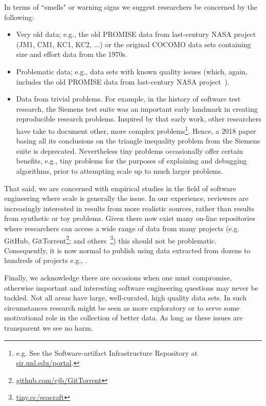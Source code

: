 \documentclass[preprint,10pt]{elsarticle}
\begin{document}
In terms of ``smells" or warning signs we suggest researchers be concerned by the following:
\begin{itemize}
\item Very old data; e.g., the old PROMISE data from last-century NASA project (JM1, CM1, KC1, KC2, ...) or the original COCOMO data sets containing size and effort data from the 1970s.
\item Problematic data; e.g., data sets with known quality issues (which, again, includes the old PROMISE data from last-century NASA project~\cite{shepperd13}).
\item Data from trivial problems.
For example, in the history of
software test research, the Siemens test suite
was an important early landmark in creating reproducible research problems. Inspired by that early work, other researchers have take to document other, more complex problems\footnote{e.g. See the Software-artifact Infrastructure Repository at
\href{http://sir.unl.edu/portal}{sir.unl.edu/portal}.}. Hence, a 2018 paper basing all its conclusions on the   triangle inequality problem
from the Siemens suite is deprecated.   Nevertheless tiny problems occasionally offer certain benefits, e.g., tiny problems for the purposes of explaining and debugging algorithms, prior to attempting scale up to much larger problems. 
\end{itemize}

That said, we are concerned with empirical studies in the field of software engineering where scale is generally the issue. In our experience, reviewers are increasingly interested in results from more realistic sources, rather than results from synthetic or toy problems. Given there now exist many on-line repositories where researchers can access a wide range of data from many projects (e.g. GitHub, GitTorrent\footnote{\href{https://github.com/cjb/GitTorrent}{github.com/cjb/GitTorrent}}; and others~\footnote{\href{http://tiny.cc/seacraft}{tiny.cc/seacraft}}) this should not be problematic. Consequently, it is now normal to publish using data extracted from dozens to hundreds of projects e.g., \cite{rahulSEIP, amritSeip18b}.

Finally, we acknowledge there are occasions when one must compromise, otherwise important and interesting software engineering questions may never be tackled.  Not all areas have large, well-curated, high quality data sets.  In such circumstances research might be seen as more exploratory or to serve some motivational role in the collection of better data.  As long as these issues are transparent we see no harm.
\end{document}
